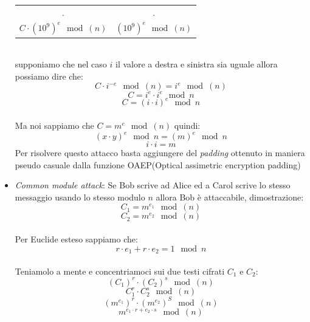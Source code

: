 \documentclass[10pt,a4paper]{article}
\begin{document}
\begin{itemize}
\begin{center}
\begin{tabular}{c|c}
.&.\\
$C\cdot (10^9)^e \mod(n)$& 	$(10^9)^e \mod(n)$ \\
\end{tabular}\\
supponiamo che nel caso $i$ il valore a destra e sinistra sia uguale allora possiamo dire che:
$$ C\cdot i^{-e} \mod(n)=i^e \mod(n)$$
$$ C=i^e\cdot i^e \mod n$$
$$ C=(i\cdot i)^e \mod n$$\\
Ma noi sappiamo che $C=m^e \mod(n)$ quindi:
$$(x\cdot y)^e \mod n = (m)^e \mod n$$
$$ i\cdot i = m$$
Per risolvere questo attacco basta aggiungere del \textit{padding} ottenuto in maniera pseudo casuale dalla funzione OAEP(Optical assimetric encryption padding)
\end{center}
\item \textit{Common module attack}: Se Bob scrive ad Alice ed a Carol scrive lo stesso messaggio usando lo stesso modulo $n$ allora Bob è attaccabile, dimostrazione:\\
$$C_1=m^{e_1} \mod(n)$$ $$ C_2=m^{e_2} \mod(n)$$\\
Per Euclide esteso sappiamo che:\\
$$r\cdot e_1+r\cdot e_2 = 1 \mod n$$\\
Teniamolo a mente e concentriamoci sui due testi cifrati $C_1$ e $C_2$:
$$(C_1)^r\cdot(C_2)^s\mod(n)$$
$$C_1^r\cdot C_2^s \mod(n)$$
$$(m^{e_1})^r\cdot (m^{e_2})^S \mod(n)$$
$$m^{e_1\cdot r + e_2\cdot s} \mod(n)$$


\end{itemize}
\end{document}
